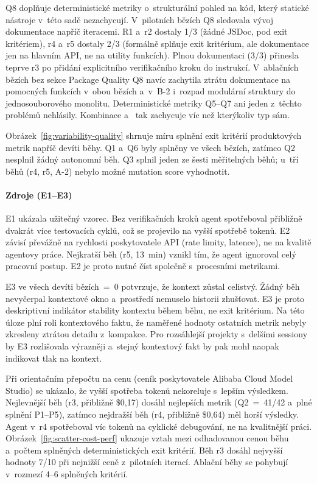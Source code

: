 \ac{Q8} doplňuje deterministické metriky o~strukturální pohled na kód,
který statické nástroje v~této sadě nezachycují. V~pilotních bězích
\acs{Q8} sledovala vývoj dokumentace napříč
iteracemi. R1 a~r2 dostaly 1/3 (žádné JSDoc, pod exit kritériem),
r4 a~r5 dostaly 2/3 (formálně splňuje exit kritérium, ale
dokumentace jen na hlavním API, ne na utility funkcích).
Plnou dokumentaci (3/3) přinesla teprve r3 po přidání explicitního
verifikačního kroku do instrukcí. V~ablačních bězích bez sekce
Package Quality \acs{Q8} navíc zachytila ztrátu dokumentace
na pomocných funkcích v~obou bězích a~v~B-2 i~rozpad modulární
struktury do jednosouborového monolitu. Deterministické metriky
\acs{Q5}--\acs{Q7} ani jeden z~těchto problémů nehlásily.
Kombinace  a~ tak zachycuje víc než
kterýkoliv typ sám.

Obrázek~\ref{fig:variability-quality} shrnuje míru splnění exit
kritérií produktových metrik napříč devíti běhy. \acs{Q1} a~\acs{Q6}
byly splněny ve všech bězích, zatímco \acs{Q2} nesplnil žádný
autonomní běh. \acs{Q3} splnil jeden ze šesti měřitelných běhů; u~tří
běhů (r4, r5, A-2) nebylo možné mutation score vyhodnotit.



\paragraph{Zdroje (E1--E3)}
\ac{E1} ukázala užitečný vzorec. Bez verifikačních kroků agent
spotřeboval přibližně dvakrát více testovacích cyklů, což se
projevilo na vyšší spotřebě tokenů. \ac{E2} závisí převážně na
rychlosti poskytovatele API (rate limity, latence), ne na kvalitě
agentovy práce. Nejkratší běh (r5, 13~min) vznikl tím, že agent
ignoroval celý pracovní postup. \acs{E2} je proto nutné číst
společně s~procesními metrikami.

\ac{E3} ve všech devíti bězích~=~0 potvrzuje, že kontext zůstal
celistvý. Žádný běh nevyčerpal kontextové okno a~prostředí nemuselo
historii zhušťovat. \acs{E3} je proto deskriptivní indikátor stability
kontextu během běhu, ne exit kritérium. Na této úloze plní roli
kontextového faktu, že naměřené hodnoty ostatních metrik nebyly zkresleny ztrátou
detailu z~kompakce. Pro rozsáhlejší projekty s~delšími sessiony by
\acs{E3} rozlišovala výrazněji a~stejný kontextový fakt by pak mohl
naopak indikovat tlak na kontext.

Při orientačním přepočtu na cenu (ceník poskytovatele Alibaba
Cloud Model Studio) se ukázalo, že vyšší spotřeba tokenů
nekoreluje s~lepším výsledkem. Nejlevnější běh (r3, přibližně
\$0,17) dosáhl nejlepších metrik (\acs{Q2}~=~41/42
a~plné splnění \acs{P1}--\acs{P5}),
zatímco nejdražší běh (r4, přibližně
\$0,64) měl horší výsledky. Agent v~r4 spotřeboval víc tokenů
na cyklické debugování, ne na kvalitnější práci.
Obrázek~\ref{fig:scatter-cost-perf} ukazuje vztah mezi odhadovanou cenou
běhu a~počtem splněných deterministických exit kritérií. Běh r3 dosáhl
nejvyšší hodnoty 7/10 při nejnižší ceně z~pilotních iterací. Ablační
běhy se pohybují v~rozmezí 4--6 splněných kritérií.

